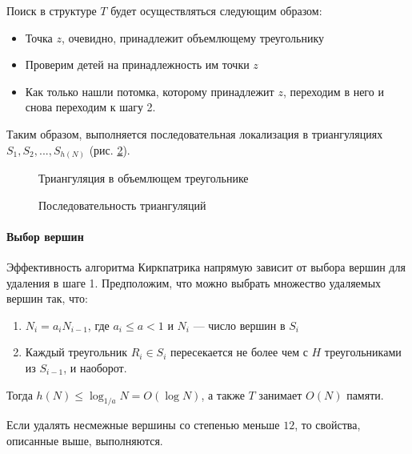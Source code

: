 Поиск в структуре $T$ будет осуществляться следующим образом:
\begin{itemize}
    \item Точка $z$, очевидно, принадлежит объемлющему треугольнику
    \item Проверим детей на принадлежность им точки $z$
    \item Как только нашли потомка, которому принадлежит $z$, переходим в него и снова переходим к шагу 2.
\end{itemize}
Таким образом, выполняется последовательная локализация в триангуляциях $S_1, S_2, ..., S_{h(N)}$ (рис. \ref{bild_triang}).

\begin{figure}[h]
    \centering
    \def\svgwidth{0.3\columnwidth}
    
    \caption{Триангуляция в объемлющем треугольнике}
    \label {triang}
\end{figure}

\begin{figure}[h]
    \centering
    \def\svgwidth{0.8\columnwidth}
    
    \caption{Последовательность триангуляций}
    \label {bild_triang}
\end{figure}

\paragraph{Выбор вершин}
Эффективность алгоритма Киркпатрика напрямую зависит от выбора вершин для удаления в шаге 1.
Предположим, что можно выбрать множество удаляемых вершин так, что:
\begin{enumerate}
    \item $N_i = a_i N_{i - 1}$, где $a_i \leqslant a < 1$ и $N_i$ --- число вершин в $S_i$
    \item Каждый треугольник $R_i \in S_i$ пересекается не более чем с $H$ треугольниками из $S_{i - 1}$, и наоборот.
\end{enumerate}
Тогда $h(N) \leqslant \log_{1 / a} N = O(\log N)$, а также $T$ занимает $O(N)$ памяти.

Если удалять несмежные вершины со степенью меньше $12$, то свойства, описанные выше, выполняются.
